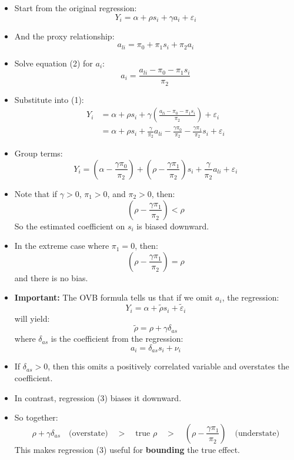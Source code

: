 \documentclass[12pt]{article}
\begin{document}
\begin{itemize}
  \item Start from the original regression:
  \[
  Y_i = \alpha + \rho s_i + \gamma a_i + \varepsilon_i \tag{1}
  \]

  \item And the proxy relationship:
  \[
  a_{li} = \pi_0 + \pi_1 s_i + \pi_2 a_i \tag{2}
  \]

  \item Solve equation (2) for $a_i$:
  \[
  a_i = \frac{a_{li} - \pi_0 - \pi_1 s_i}{\pi_2}
  \]

  \item Substitute into (1):
  \begin{align}
  Y_i &= \alpha + \rho s_i + \gamma \left( \frac{a_{li} - \pi_0 - \pi_1 s_i}{\pi_2} \right) + \varepsilon_i \\
      &= \alpha + \rho s_i + \frac{\gamma}{\pi_2} a_{li} - \frac{\gamma \pi_0}{\pi_2} - \frac{\gamma \pi_1}{\pi_2} s_i + \varepsilon_i
  \end{align}

  \item Group terms:
  \[
  Y_i = \left( \alpha - \frac{\gamma \pi_0}{\pi_2} \right) + \left( \rho - \frac{\gamma \pi_1}{\pi_2} \right) s_i + \frac{\gamma}{\pi_2} a_{li} + \varepsilon_i \tag{3}
  \]

  \item Note that if $\gamma > 0$, $\pi_1 > 0$, and $\pi_2 > 0$, then:
  \[
  \left( \rho - \frac{\gamma \pi_1}{\pi_2} \right) < \rho
  \]
  So the estimated coefficient on $s_i$ is biased downward.

  \item In the extreme case where $\pi_1 = 0$, then:
  \[
  \left( \rho - \frac{\gamma \pi_1}{\pi_2} \right) = \rho
  \]
  and there is no bias.
  
  \item \textbf{Important:} The OVB formula tells us that if we omit $a_i$, the regression:
  \[
  Y_i = \alpha + \tilde{\rho} s_i + \tilde{\varepsilon}_i
  \]
  will yield:
  \[
  \tilde{\rho} = \rho + \gamma \delta_{as}
  \]
  where $\delta_{as}$ is the coefficient from the regression:
  \[
  a_i = \delta_{as} s_i + \nu_i
  \]

  \item If $\delta_{as} > 0$, then this omits a positively correlated variable and overstates the coefficient.

  \item In contrast, regression (3) biases it downward.

  \item So together:
  \[
  \rho + \gamma \delta_{as} \quad \text{(overstate)} \quad > \quad \text{true } \rho \quad > \quad \left( \rho - \frac{\gamma \pi_1}{\pi_2} \right) \quad \text{(understate)}
  \]
  This makes regression (3) useful for \textbf{bounding} the true effect.
\end{itemize}
\end{document}
